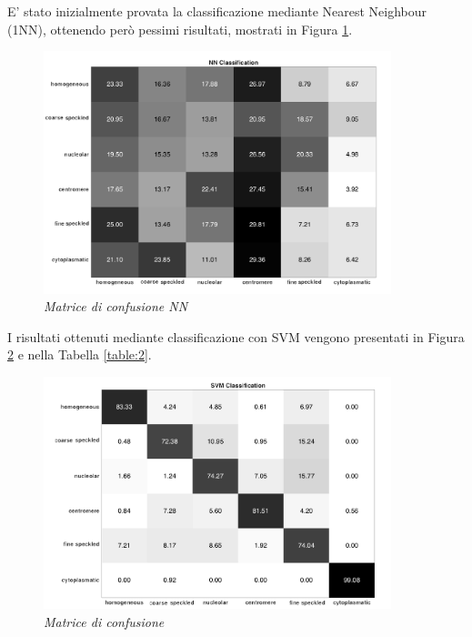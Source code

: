 E' stato inizialmente provata la classificazione mediante Nearest Neighbour (1NN), ottenendo però pessimi risultati, mostrati in Figura \ref{fig:nn}.

\begin{figure}[H] 
  \centering
    \includegraphics[width=0.9\textwidth]{images/confusion_matrix_nn.png}
    \caption{{\small \textit{Matrice di confusione NN}}}
    \label{fig:nn}
\end{figure}

I risultati ottenuti mediante classificazione con SVM vengono presentati in Figura \ref{fig:mat2} e nella Tabella \ref{table:2}.

\begin{figure}[H] 
  \centering
    \includegraphics[width=0.9\textwidth]{images/conf_mat_2.png}
    \caption{{\small \textit{Matrice di confusione}}}
    \label{fig:mat2}
\end{figure}

